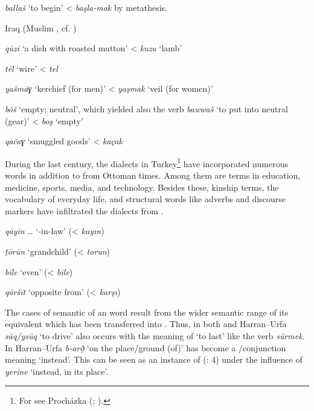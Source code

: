 \documentclass[output=paper]{langsci/langscibook}
\begin{document}
\textit{ballaš} ‘to begin’ <  \textit{başla-mak} by metathesis.
\z

\ea
Iraq (Muslim , cf. \citealt{Reinkowski1995}) 

\textit{qūzi} ‘a dish with roasted mutton’ <  \textit{kuzu} ‘lamb’

\textit{tēl} ‘wire’ <  \textit{tel}

\textit{yašmāɣ} ‘kerchief (for men)’ <  \textit{yaşmak} ‘veil (for women)’

\textit{bōš} ‘empty; neutral’, which yielded also the verb \textit{bawwaš} ‘to put into neutral (gear)’ <  \textit{boş} ‘empty’

\textit{qačaɣ} ‘smuggled goods’ <  \textit{kaçak}
\z

During the last century, the  dialects in Turkey\footnote{For  see Procházka (\citeyear{Procházka2002Cukurova}; \citeyear[187--199]{Procházka2002Adana}).} have incorporated numerous  words in addition to  from Ottoman times. Among them are terms in education, medicine, sports, media, and technology. Besides these, kinship terms, the vocabulary of everyday life, and structural words like adverbs and discourse markers have infiltrated the dialects from . 

\ea
{} 

\textit{qāyin} \textit{…} ‘-in-law’ (<  \textit{kayın})

\textit{ṭōrūn} ‘grandchild’ (<  \textit{torun})

\textit{bīle} ‘even’ (<  \textit{bile})

\textit{qāršīt} ‘opposite from’ (<  \textit{karşı})
\z

The cases of semantic  of an  word result from the wider semantic range of its  equivalent which has been transferred into . Thus, in both  and Harran--Urfa  \textit{sāq/ysūq} ‘to drive’ also occurs with the meaning of ‘to last’ like the  verb \textit{sürmek}. In Harran--Urfa \textit{b-arð̣} ‘on the place/ground (of)’ has become a /conjunction meaning ‘instead’. This can be seen as an instance of  (\citealt{GardaniArkadievAmiridze2015}: 4) under the influence of  \textit{yerine} ‘instead, in its place’.
\end{document}
